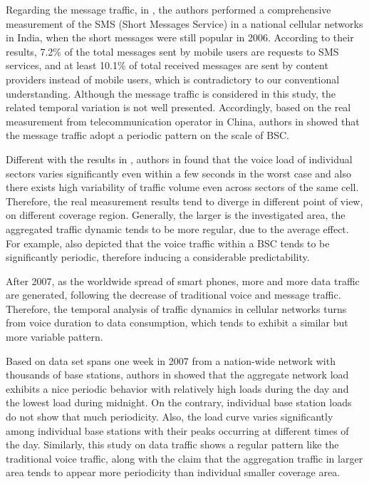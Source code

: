 Regarding the message traffic, in \cite{zerfos2006study}, the authors performed a comprehensive measurement of the SMS (Short Messages Service) in a national cellular networks in India, when the short messages were still popular in 2006. According to their results, 7.2\% of the total messages sent by mobile users are requests to SMS services, and at least 10.1\% of total received messages are sent by content providers instead of mobile users, which is contradictory to our conventional understanding. Although the message traffic is considered in this study, the related temporal variation is not well presented. Accordingly, based on the real measurement from telecommunication operator in China, authors in \cite{zhou2012predictability} showed that the message traffic adopt a periodic pattern on the scale of BSC.

Different with the results in \cite{almeida1999spatial}, authors in \cite{willkomm2008primary} found that the voice load of individual sectors varies significantly even within a few seconds in the worst case and also there exists high variability of traffic volume even across sectors of the same cell. Therefore, the real measurement results tend to diverge in different point of view, on different coverage region. Generally, the larger is the investigated area, the aggregated traffic dynamic tends to be more regular, due to the average effect. For example, \cite{zhou2012predictability} also depicted that the voice traffic within a BSC tends to be significantly periodic, therefore inducing a considerable predictability.

After 2007, as the worldwide spread of smart phones, more and more data traffic are generated, following the decrease of traditional voice and message traffic. Therefore, the temporal analysis of traffic dynamics in cellular networks turns from voice duration to data consumption, which tends to exhibit a similar but more variable pattern.

Based on data set spans one week in 2007 from a nation-wide network with thousands of base stations, authors in \cite{paul2011understanding} showed that the aggregate network load exhibits a nice periodic behavior with relatively high loads during the day and the lowest load during midnight. On the contrary, individual base station loads do not show that much periodicity. Also, the load curve varies significantly among individual base stations with their peaks occurring at different times of the day. Similarly, this study on data traffic shows a regular pattern like the traditional voice traffic, along with the claim that the aggregation traffic in larger area tends to appear more periodicity than individual smaller coverage area.

